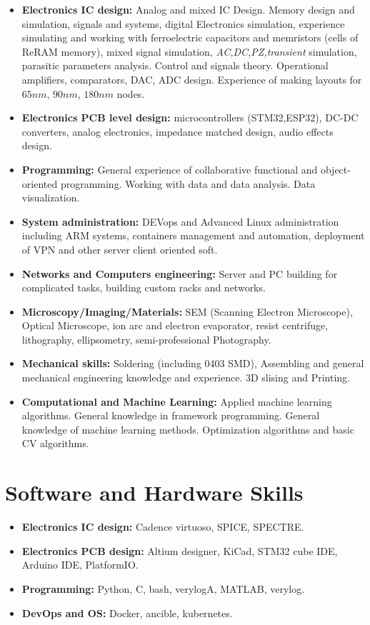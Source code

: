 \documentclass{article}
\begin{document}
\begin{itemize}
\item \textbf{Electronics IC design:} Analog and mixed IC Design. Memory design and simulation, signals and systems, digital Electronics simulation, experience simulating and working with ferroelectric capacitors and memristors (cells of ReRAM memory),   mixed signal simulation, \textit{AC,DC,PZ,transient} simulation, parasitic parameters analysis. Control and signals theory. Operational amplifiers, comparators, DAC, ADC design. Experience of making layouts for $65 nm$, $90nm$, $180nm$ nodes. 
\item \textbf{Electronics PCB level design:} microcontrollers (STM32,ESP32), DC-DC converters, analog electronics, impedance matched design, audio effects design.
\item \textbf{Programming:} General experience of collaborative functional and object-oriented programming. Working with data and data analysis. Data visualization.
\item \textbf{System administration:} DEVops and Advanced Linux administration including ARM systems, containers management and automation, deployment of VPN and other server client oriented soft.
\item \textbf{Networks and Computers engineering:} Server and PC building for complicated tasks, building custom racks and networks.
\item \textbf{Microscopy/Imaging/Materials:} SEM (Scanning Electron Microscope), Optical Microscope, ion arc and electron evaporator, resist centrifuge, lithography, ellipsometry, semi-professional Photography.
\item \textbf{Mechanical skills:} Soldering (including 0403 SMD), Assembling and general mechanical engineering knowledge and experience. 3D slising and Printing.
\item \textbf{Computational and Machine Learning:} Applied machine learning algorithms. General knowledge in framework programming. General knowledge of machine learning methods. Optimization algorithms and basic CV algorithms.
\end{itemize}
 
\section{Software and Hardware Skills}
\begin{itemize}
\item \textbf{Electronics IC design:} Cadence virtuoso, SPICE, SPECTRE.
\item \textbf{Electronics PCB design:} Altium designer, KiCad, STM32 cube IDE, Arduino IDE, PlatformIO.
\item \textbf{Programming:} Python, C, bash, verylogA, MATLAB, verylog.
\item \textbf{DevOps and OS:} Docker, ancible, kubernetes.
\end{itemize}
\end{document}
